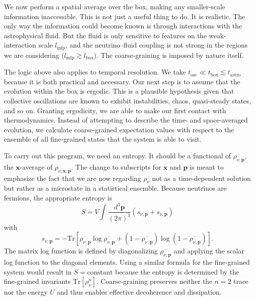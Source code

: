 \documentclass[aps,prd,twocolumn,groupedaddress,preprintnumbers]{revtex4-2}
\begin{document}
We now perform a spatial average over the box, making any smaller-scale information inaccessible. This is not just a useful thing to do. It is realistic. The only way the information could become known is through interactions with the astrophysical fluid. But the fluid is only sensitive to features on the weak-interaction scale $l_\textrm{mfp}$, and the neutrino--fluid coupling is not strong in the regions we are considering ($l_\textrm{mfp} \gtrsim l_\textrm{box}$). The coarse-graining is imposed by nature itself.

The logic above also applies to temporal resolution. We take $t_\textrm{osc} \ll t_\textrm{box} \lesssim t_\textrm{astro}$ because it is both practical and necessary. Our next step is to assume that the evolution within the box is ergodic. This is a plausible hypothesis given that collective oscillations are known to exhibit instabilities, chaos, quasi-steady states, and so on. Granting ergodicity, we are able to make our first contact with thermodynamics. Instead of attempting to describe the time- and space-averaged evolution, we calculate coarse-grained expectation values with respect to the ensemble of all fine-grained states that the system is able to visit.

To carry out this program, we need an entropy. It should be a functional of $\overline{\rho_{\nu,\boldsymbol{p}}}$, the $\boldsymbol{x}$-average of $\rho_{\nu,\boldsymbol{x},\boldsymbol{p}}$. The change to subscripts for $\boldsymbol{x}$ and $\boldsymbol{p}$ is meant to emphasize the fact that we are now regarding $\rho_\nu$ not as a time-dependent solution but rather as a microstate in a statistical ensemble. Because neutrinos are fermions, the appropriate entropy is
\begin{equation}
S = V \int \frac{d^3 \boldsymbol{p}}{(2\pi)^3} \left( s_{\nu,\boldsymbol{p}} + s_{\bar{\nu},\boldsymbol{p}} \right) \label{eq:entropy1}
\end{equation}
with
\begin{equation}
s_{\nu,\boldsymbol{p}} = -\textrm{Tr} \left[ \overline{\rho_{\nu,\boldsymbol{p}}} \log \overline{\rho_{\nu,\boldsymbol{p}}} + \left( 1 - \overline{\rho_{\nu,\boldsymbol{p}}} \right) \log \left( 1 - \overline{\rho_{\nu,\boldsymbol{p}}} \right) \right]. \label{eq:entropy2}
\end{equation}
The matrix log function is defined by diagonalizing $\overline{\rho_{\nu,\boldsymbol{p}}}$ and applying the scalar log function to the diagonal elements. Using a similar formula for the fine-grained system would result in $S = \textrm{constant}$ because the entropy is determined by the fine-grained invariants $\textrm{Tr}\left[ \rho_\nu^n \right]$. Coarse-graining preserves neither the $n=2$ trace nor the energy $U$ and thus enables effective decoherence and dissipation.
\end{document}
